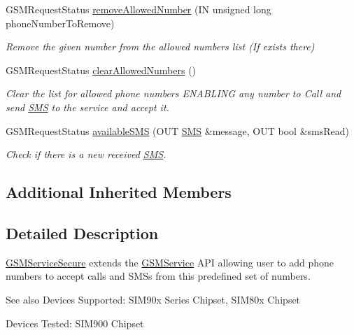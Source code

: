 \begin{DoxyCompactItemize}
G\+S\+M\+Request\+Status \hyperlink{class_easyuino_1_1_g_s_m_service_secure_a1ad4988fa2dcc0ba8f87c70cf71edf29}{remove\+Allowed\+Number} (IN unsigned long phone\+Number\+To\+Remove)
\begin{DoxyCompactList}\small\item\em Remove the given number from the allowed numbers list (If exists there) \end{DoxyCompactList}\item 
G\+S\+M\+Request\+Status \hyperlink{class_easyuino_1_1_g_s_m_service_secure_a10a8160dfb473d84b4bd182d689bdb95}{clear\+Allowed\+Numbers} ()
\begin{DoxyCompactList}\small\item\em Clear the list for allowed phone numbers E\+N\+A\+B\+L\+I\+NG any number to Call and send \hyperlink{class_easyuino_1_1_s_m_s}{S\+MS} to the service and accept it. \end{DoxyCompactList}\item 
G\+S\+M\+Request\+Status \hyperlink{class_easyuino_1_1_g_s_m_service_secure_a42177d8a9943f30a2b63f9bc51a5370d}{available\+S\+MS} (O\+UT \hyperlink{class_easyuino_1_1_s_m_s}{S\+MS} \&message, O\+UT bool \&sms\+Read)
\begin{DoxyCompactList}\small\item\em Check if there is a new received \hyperlink{class_easyuino_1_1_s_m_s}{S\+MS}. \end{DoxyCompactList}\end{DoxyCompactItemize}
\subsection*{Additional Inherited Members}


\subsection{Detailed Description}
\hyperlink{class_easyuino_1_1_g_s_m_service_secure}{G\+S\+M\+Service\+Secure} extends the \hyperlink{class_easyuino_1_1_g_s_m_service}{G\+S\+M\+Service} A\+PI allowing user to add phone numbers to accept calls and S\+M\+Ss from this predefined set of numbers. 

\begin{DoxySeeAlso}{See also}
Devices Supported\+: S\+I\+M90x Series Chipset, S\+I\+M80x Chipset 

Devices Tested\+: S\+I\+M900 Chipset 
\end{DoxySeeAlso}


